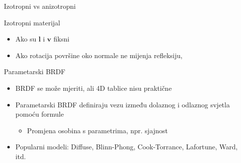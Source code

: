 \documentclass[9pt]{beamer}
\begin{document}
\begin{frame}{Izotropni vs anizotropni}
	\begin{block}{Izotropni materijal}
		\begin{itemize} %
			\item Ako su $\mathbf{l}$ i $\mathbf{v}$ fiksni 
			\item Ako rotacija površine oko normale ne mijenja refleksiju,
		\end{itemize}
	\end{block}	
\end{frame}

\begin{frame}{Parametarski BRDF}
	\begin{itemize} %
		\item BRDF se može mjeriti, ali 4D tablice nisu praktične
		\item Parametarski BRDF definiraju vezu između dolaznog i odlaznog svjetla pomoću formule
		\begin{itemize} %
			\item Promjena osobina s parametrima, npr. sjajnost
		\end{itemize}
		\item Popularni modeli: Diffuse, Blinn-Phong, Cook-Torrance, Lafortune, Ward, itd.
	\end{itemize}
\end{frame}
\end{document}
